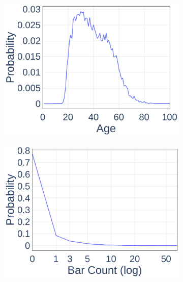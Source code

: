 \begin{figure}[ht]
  \centering

	\begin{subfigure}[b]{0.3\textwidth}
    \includegraphics[width=\textwidth]{Figures/Data-Age-PDF}
  \end{subfigure}
	\begin{subfigure}[b]{0.3\textwidth}
    \includegraphics[width=\textwidth]{Figures/Data-Bar-PDF}
  \end{subfigure}
	\begin{subfigure}[b]{0.3\textwidth}

\end{subfigure}
\end{figure}
